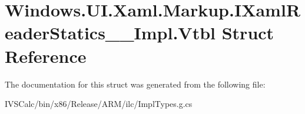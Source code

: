 \hypertarget{struct_windows_1_1_u_i_1_1_xaml_1_1_markup_1_1_i_xaml_reader_statics_____impl_1_1_vtbl}{}\section{Windows.\+U\+I.\+Xaml.\+Markup.\+I\+Xaml\+Reader\+Statics\+\_\+\+\_\+\+Impl.\+Vtbl Struct Reference}
\label{struct_windows_1_1_u_i_1_1_xaml_1_1_markup_1_1_i_xaml_reader_statics_____impl_1_1_vtbl}


The documentation for this struct was generated from the following file\+:\begin{DoxyCompactItemize}
\item 
I\+V\+S\+Calc/bin/x86/\+Release/\+A\+R\+M/ilc/Impl\+Types.\+g.\+cs\end{DoxyCompactItemize}
